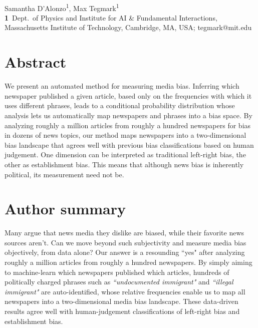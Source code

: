 \documentclass[10pt,letterpaper]{article}
\begin{document}
\vspace*{0.2in}

\begin{flushleft}
{\Large
\textbf{} %
}
\newline
\\
Samantha D'Alonzo\textsuperscript{1},
Max Tegmark\textsuperscript{1}
\\
\bigskip
\textbf{1}~Dept.~of Physics and Institute for AI \& Fundamental Interactions,\\
Massachusetts Institute of Technology, Cambridge, MA, USA; tegmark@mit.edu\\
\bigskip
\end{flushleft}
\section*{Abstract}
We present an automated method for measuring media bias.
Inferring which newspaper published a given article, based only on the frequencies with which it uses different phrases, leads to a conditional probability distribution whose analysis lets us automatically map newspapers and phrases into a bias space.
By analyzing roughly a million articles from roughly a hundred newspapers for bias in dozens of news topics, our method maps newspapers into a two-dimensional bias landscape that agrees well with previous
bias classifications based on human judgement. One dimension can be interpreted as traditional left-right bias, the other as establishment bias. This means that although news bias is inherently political, its measurement need not be.
\section*{Author summary}
Many argue that news media they dislike are biased, while their favorite news sources aren't. Can we move beyond such subjectivity and measure media bias objectively, from data alone? 
Our answer is a resounding ``yes" after analyzing roughly a million articles from roughly a hundred newspapers.
By simply aiming to machine-learn which newspapers published which articles, 
hundreds of politically charged phrases such as {\it ``undocumented immigrant"} and {\it ``illegal immigrant"} are auto-identified, whose relative frequencies enable us to map all newspapers into a two-dimensional media bias landscape. These data-driven results agree well with human-judgement classifications of left-right bias and establishment bias.
\end{document}

